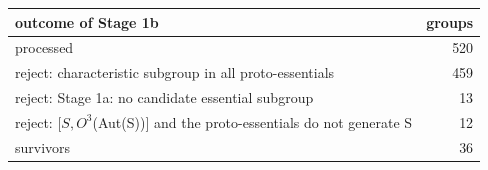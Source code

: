 \begin{tabular}{lr}
\toprule
outcome of Stage 1b & groups\\
\midrule
processed & 520\\
reject: characteristic subgroup in all proto-essentials & 459\\
reject: Stage 1a: no candidate essential subgroup & 13\\
reject: $[S,$$O^3$(Aut(S))$]$ and the proto-essentials do not generate S & 12\\
survivors & 36\\
\bottomrule
\end{tabular}

